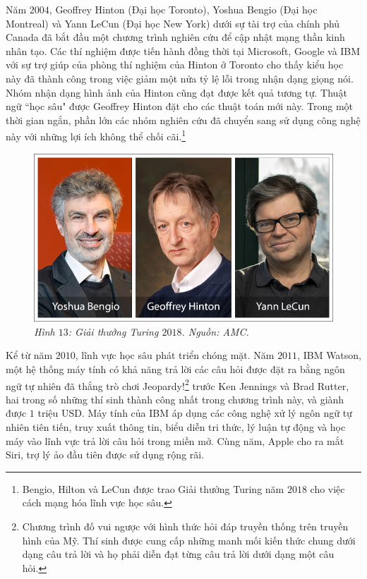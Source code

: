 \begin{multicols}{2}
\begin{figure}[H]
		\vspace*{-10pt}
	\end{figure}
	Năm $2004$, Geoffrey Hinton (Đại học Toronto), Yoshua Bengio (Đại học Montreal) và Yann LeCun (Đại học New York) dưới sự tài trợ của chính phủ Canada đã bắt đầu một chương trình nghiên cứu để cập nhật mạng thần kinh nhân tạo. Các thí nghiệm được tiến hành đồng thời tại Microsoft, Google và IBM với sự trợ giúp của phòng thí nghiệm của Hinton  ở Toronto cho thấy kiểu học này đã thành công trong việc giảm một nửa tỷ lệ lỗi trong nhận dạng giọng nói. Nhóm nhận dạng hình ảnh của Hinton cũng đạt được kết quả tương tự. Thuật ngữ ``học sâu" được Geoffrey Hinton đặt cho các thuật toán mới này. Trong một thời gian ngắn, phần lớn các nhóm nghiên cứu đã chuyển sang sử dụng công nghệ này với những lợi ích không thể chối cãi.\footnote{\color{cackithi}Bengio, Hilton và LeCun được trao Giải thưởng Turing năm $2018$ cho việc cách mạng hóa lĩnh vực học sâu.} 
	\begin{figure}[H]
		\vspace*{5pt}
		\centering
		\captionsetup{labelformat= empty, justification=centering}
		\includegraphics[width= 1\linewidth]{turing-2018-bengio-hinton-lecun.jpg}
		\caption{\small\textit{\color{cackithi}Hình $13$: Giải thưởng Turing $2018$. Nguồn: AMC.}}
		\vspace*{-15pt}
	\end{figure}
	Kể từ năm $2010$, lĩnh vực học sâu phát triển chóng mặt. 
	\vskip 0.1cm
	Năm $2011$, IBM Watson, một hệ thống máy tính có khả năng trả lời các câu hỏi được đặt ra bằng ngôn ngữ tự nhiên đã thắng trò chơi Jeopardy!\footnote{\color{cackithi}Chương trình đố vui ngược với hình thức hỏi đáp truyền thống trên truyền hình của Mỹ. Thí sinh được cung cấp những manh mối kiến thức chung dưới dạng câu trả lời và họ phải diễn đạt từng câu trả lời dưới dạng một câu hỏi.} trước Ken Jennings và Brad Rutter, hai trong số những thí sinh thành công nhất trong chương trình này, và giành được $1$ triệu USD. Máy tính của IBM áp dụng các công nghệ xử lý ngôn ngữ tự nhiên tiên tiến, truy xuất thông tin, biểu diễn tri thức, lý luận tự động và học máy vào lĩnh vực trả lời câu hỏi trong miền mở. Cùng năm, Apple cho ra mắt Siri, trợ lý ảo đầu tiên được sử dụng rộng rãi.

\end{multicols}
